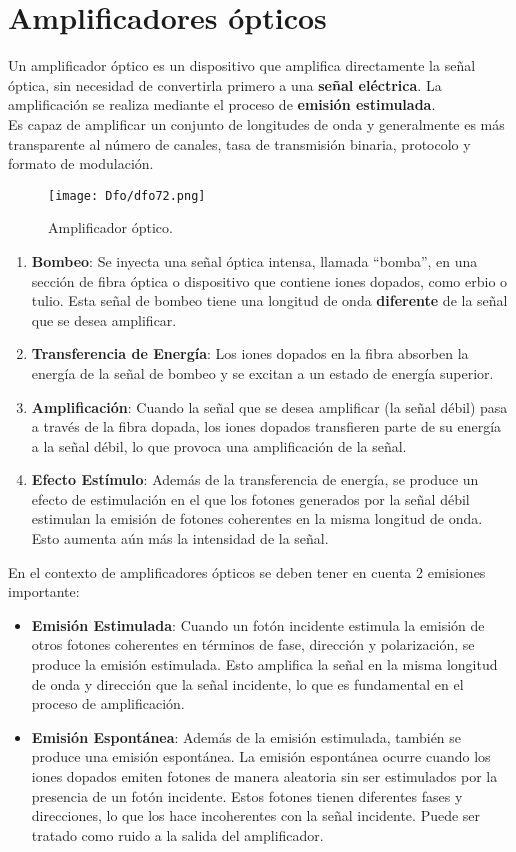 \documentclass[
	12pt, %
	fleqn, %
	a4paper, %
	oneside, %
]{LegrandOrangeBook}
\begin{document}
\chapter{Amplificadores ópticos}
Un amplificador óptico es un dispositivo que amplifica directamente la señal óptica, sin necesidad de convertirla primero a una \textbf{señal eléctrica}. La amplificación se realiza mediante el proceso de \textbf{emisión estimulada}.\\
Es capaz de amplificar un conjunto de longitudes de onda y generalmente es más transparente al número de canales, tasa de transmisión binaria, protocolo y formato de modulación.
\begin{figure}[H]
\centering
\texttt{[image: Dfo/dfo72.png]}
\caption{Amplificador óptico.}
\end{figure}
\begin{enumerate}
\item \textbf{Bombeo}: Se inyecta una señal óptica intensa, llamada ``bomba'', en una sección de fibra óptica o dispositivo que contiene iones dopados, como erbio o tulio. Esta señal de bombeo tiene una longitud de onda \textbf{diferente} de la señal que se desea amplificar.

\item \textbf{Transferencia de Energía}: Los iones dopados en la fibra absorben la energía de la señal de bombeo y se excitan a un estado de energía superior.

\item \textbf{Amplificación}: Cuando la señal que se desea amplificar (la señal débil) pasa a través de la fibra dopada, los iones dopados transfieren parte de su energía a la señal débil, lo que provoca una amplificación de la señal.

\item \textbf{Efecto Estímulo}: Además de la transferencia de energía, se produce un efecto de estimulación en el que los fotones generados por la señal débil estimulan la emisión de fotones coherentes en la misma longitud de onda. Esto aumenta aún más la intensidad de la señal.
\end{enumerate}
En el contexto de amplificadores ópticos se deben tener en cuenta 2 emisiones importante:
\begin{itemize}
\item \textbf{Emisión Estimulada}: Cuando un fotón incidente estimula la emisión de otros fotones coherentes en términos de fase, dirección y polarización, se produce la emisión estimulada. Esto amplifica la señal en la misma longitud de onda y dirección que la señal incidente, lo que es fundamental en el proceso de amplificación.

\item \textbf{Emisión Espontánea}: Además de la emisión estimulada, también se produce una emisión espontánea. La emisión espontánea ocurre cuando los iones dopados emiten fotones de manera aleatoria sin ser estimulados por la presencia de un fotón incidente. Estos fotones tienen diferentes fases y direcciones, lo que los hace incoherentes con la señal incidente. Puede ser tratado como ruido a la salida del amplificador.
\end{itemize}
\end{document}
